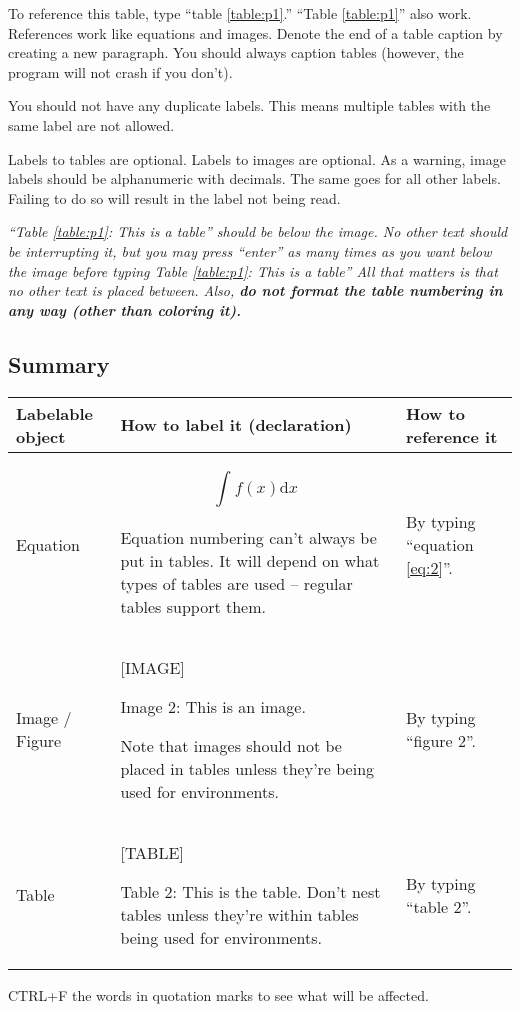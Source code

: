 \documentclass[12pt]{article}
\theoremstyle{plain}
\theoremstyle{remark}
\theoremstyle{definition}
\begin{document}
To reference this table, type ``table \ref{table:p1}.'' ``Table \ref{table:p1}'' also work.
References work like equations and images. Denote the end of a table
caption by creating a new paragraph. You should always caption tables
(however, the program will not crash if you don't).

You should not have any duplicate labels. This means multiple tables
with the same label are not allowed.

Labels to tables are optional. Labels to images are optional. As a
warning, image labels should be alphanumeric with decimals. The same
goes for all other labels. Failing to do so will result in the label not
being read.

\emph{``Table \ref{table:p1}: This is a table'' should be below the image. No other
text should be interrupting it, but you may press ``enter'' as many
times as you want below the image before typing Table \ref{table:p1}: This is a
table'' All that matters is that no other text is placed between. Also,
\textbf{do not format the table numbering in any way (other than
coloring it).}}


\subsection{Summary}

\begin{table}[H]
\centering


\begin{tabular}{|m{11em}|m{11em}|m{11em}|}

\hline
\textbf{Labelable object}& \textbf{How to label it (declaration)}& \textbf{How to reference it}\\ \hline
Equation & 
\begin{equation}
\int_{}^{}{f(x)\text{d}x}\tag{2} \label{eq:2}
\end{equation}


Equation numbering can't always be put in tables. It will depend on what
types of tables are used -- regular tables support them. & By typing
``equation \ref{eq:2}''. \\ \hline
Image / Figure & {[}IMAGE{]}

Image 2: This is an image.

Note that images should not be placed in tables unless they're being
used for environments. & By typing ``figure 2''. \\ \hline
Table & {[}TABLE{]}

Table 2: This is the table. Don't nest tables unless they're within
tables being used for environments. & By typing ``table 2''.
\\\hline
\end{tabular}

\end{table}
CTRL+F the words in quotation marks to see what will be affected.
\end{document}
